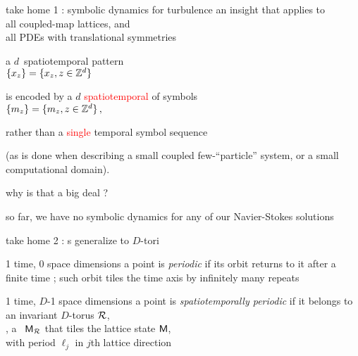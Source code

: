 \begin{frame}{take home 1 : symbolic dynamics for turbulence}
an insight that applies to \\
all coupled-map lattices, and \\
all PDEs with translational symmetries

\bigskip
a $d$\dmn\ spatiotemporal pattern\\
\(
\{x_{z}\} = \{x_{z},  z\in \mathbb{Z}^{d}  \}
\)

\bigskip
is encoded by a {\em $d$\dmn} \textcolor{red}{spatiotemporal {\brick}} of symbols\\
\(
\{m_{z}\} = \{m_{z}, z\in \mathbb{Z}^{d}\}
\,,
\)

\bigskip
rather than a \textcolor{red}{single} temporal symbol sequence

\bigskip
(as is done
when describing a small coupled few-``particle'' system, or a small
computational domain).
\end{frame}

\begin{frame}{why is that a big deal ?}
\begin{center}
so far, we {\huge have no symbolic dynamics} for any of our Navier-Stokes solutions
\end{center}

\vfill
\color{red}{this explains why, tells us what to do  about it}
\end{frame}


\begin{frame}{take home 2 : \po s generalize to $D$-tori}
\begin{block}{1 time, 0 space dimensions}
a {\statesp} point is {\em periodic} if its orbit returns to it
after a finite time \period{}; such orbit tiles the time axis
by infinitely many repeats
\end{block}

\bigskip
\begin{block}{1 time, $D$-1 space dimensions}
 a {\statesp} point is {\em spatiotemporally periodic} if
it belongs to \\ an invariant $D$-torus ${\mathcal{R}}$,\\
\ie, a \brick\ $\mathsf{M}_{\mathcal{R}}$ that
tiles the lattice state  $\mathsf{M}$, \\
with period $\ell_j$ in $j$th lattice direction
\end{block}
\end{frame}


